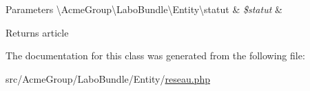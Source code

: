 \begin{DoxyParams}[1]{Parameters}
\textbackslash{}\+Acme\+Group\textbackslash{}\+Labo\+Bundle\textbackslash{}\+Entity\textbackslash{}statut & {\em \$statut} & \\
\hline
\end{DoxyParams}
\begin{DoxyReturn}{Returns}
article 
\end{DoxyReturn}


The documentation for this class was generated from the following file\+:\begin{DoxyCompactItemize}
\item 
src/\+Acme\+Group/\+Labo\+Bundle/\+Entity/\hyperlink{reseau_8php}{reseau.\+php}\end{DoxyCompactItemize}
